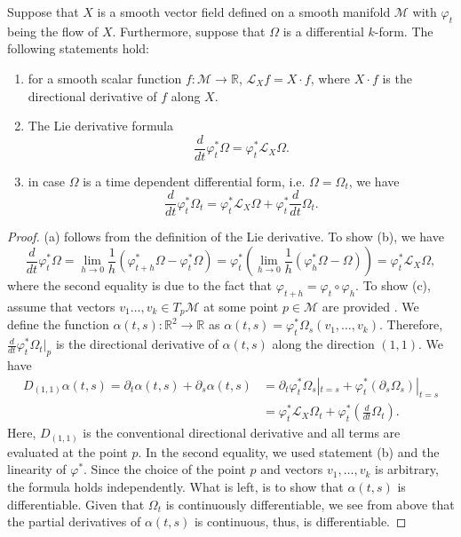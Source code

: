 \begin{theorem} \label{theorem:2.3}
Suppose that $X$ is a smooth vector field defined on a smooth manifold $\mathcal M$ with $\varphi_t$ being the flow of $X$. Furthermore, suppose that $\Omega$ is a differential $k$-form. The following statements hold:
\begin{enumerate} [label=(\alph*)]
\item for a smooth scalar function $f:\mathcal M \to \mathbb R$, $\mathcal L_X f = X\cdot f$, where $X \cdot f$ is the directional derivative of $f$ along $X$.
\item The Lie derivative formula
\[
	\frac{d}{dt} \varphi^*_t \Omega = \varphi^*_t \mathcal L_X \Omega.
\]
\item in case $\Omega$ is a time dependent differential form, i.e. $\Omega = \Omega_t$, we have
\[
	\frac{d}{dt} \varphi^*_t \Omega_t = \varphi^*_t \mathcal L_X \Omega + \varphi^*_t \frac{d}{dt} \Omega_t.
\]
\end{enumerate}
\end{theorem}
\begin{proof}
(a) follows from the definition of the Lie derivative. To show (b), we have
\begin{equation} \label{eq:2.11}
	\frac{d}{dt} \varphi^*_t \Omega = \lim_{h\to 0} \frac 1 h( \varphi^*_{t+h} \Omega - \varphi^*_t \Omega ) = \varphi^*_t (\lim_{h\to 0} \frac 1 h (\varphi^*_{h} \Omega - \Omega) ) = \varphi^*_t \mathcal L_X \Omega,
\end{equation}
where the second equality is due to the fact that $\varphi_{t+h} = \varphi_t \circ \varphi_h$. To show (c), assume that vectors $v_1\dots,v_k\in T_{p}\mathcal M$ at some point $p\in \mathcal M$ are provided . We define the function $\alpha(t,s):\mathbb R^2 \to \mathbb R$ as $\alpha(t,s) = \varphi_t^*\Omega_s(v_1,\dots,v_k)$. Therefore, $\frac{d}{dt} \varphi^*_t \Omega_t|_p$ is the directional derivative of $\alpha(t,s)$ along the direction $(1,1)$. We have
\begin{equation} \label{eq:2.12}
\begin{aligned}
	D_{(1,1)} \alpha(t,s) = \partial_t \alpha(t,s) + \partial_s  \alpha(t,s) &= \partial_t \varphi^*_t \Omega_s|_{t=s} + \varphi^*_t (\partial_s \Omega_s)|_{t=s} \\
	&= \varphi^*_t \mathcal L_X \Omega_t + \varphi^*_t (\frac{d}{dt} \Omega_t).
\end{aligned}
\end{equation}
Here, $D_{(1,1)}$ is the conventional directional derivative and all terms are evaluated at the point $p$. In the second equality, we used statement (b) and the linearity of $\varphi^*$. Since the choice of the point $p$ and vectors $v_1,\dots,v_k$ is arbitrary, the formula holds independently. What is left, is to show that $\alpha(t,s)$ is differentiable. Given that $\Omega_t$ is continuously differentiable, we see from above that the partial derivatives of $\alpha(t,s)$ is continuous, thus, is differentiable. 
\end{proof}

